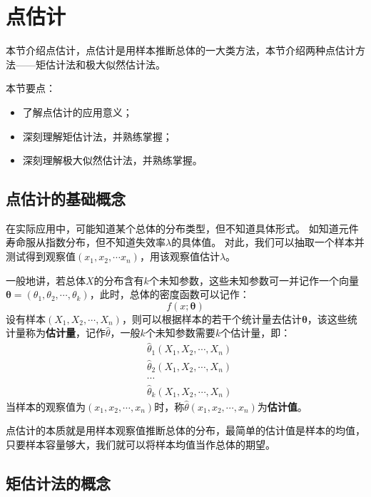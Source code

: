 \section{点估计}

本节介绍点估计，点估计是用样本推断总体的一大类方法，本节介绍两种点估计方法——矩估计法和极大似然估计法。

本节要点：
\begin{itemize}
    \item 了解点估计的应用意义；
    \item 深刻理解矩估计法，并熟练掌握；
    \item 深刻理解极大似然估计法，并熟练掌握。
\end{itemize}

\subsection{点估计的基础概念}

在实际应用中，可能知道某个总体的分布类型，但不知道具体形式。
如知道元件寿命服从指数分布，但不知道失效率$\lambda $的具体值。
对此，我们可以抽取一个样本并测试得到观察值$\left( x_1,x_2,\cdots x_n \right) $，用该观察值估计$\lambda $。

一般地讲，若总体$X$的分布含有$k$个未知参数，这些未知参数可一并记作一个向量$\boldsymbol{\theta }=\left( \theta _1,\theta _2,\cdots ,\theta _k \right) $，此时，总体的密度函数可以记作：
\[
f\left( x;\boldsymbol{\theta } \right)
\]
设有样本$\left( X_1,X_2,\cdots ,X_n \right) $，则可以根据样本的若干个统计量去估计$\boldsymbol{\theta }$，该这些统计量称为{\bf 估计量}，记作$\hat{\theta}$，一般$k$个未知参数需要$k$个估计量，即：
\begin{align*}
&\hat{\theta}_1\left( X_1,X_2,\cdots ,X_n \right) \\
&\hat{\theta}_2\left( X_1,X_2,\cdots ,X_n \right) \\
&\cdots \\
&\hat{\theta}_k\left( X_1,X_2,\cdots ,X_n \right)
\end{align*}
当样本的观察值为$\left( x_1,x_2,\cdots ,x_n \right) $时，称$\hat{\theta}\left( x_1,x_2,\cdots ,x_n \right) $为{\bf 估计值}。

点估计的本质就是用样本观察值推断总体的分布，最简单的估计值是样本的均值，只要样本容量够大，我们就可以将样本均值当作总体的期望。

\subsection{矩估计法的概念}

